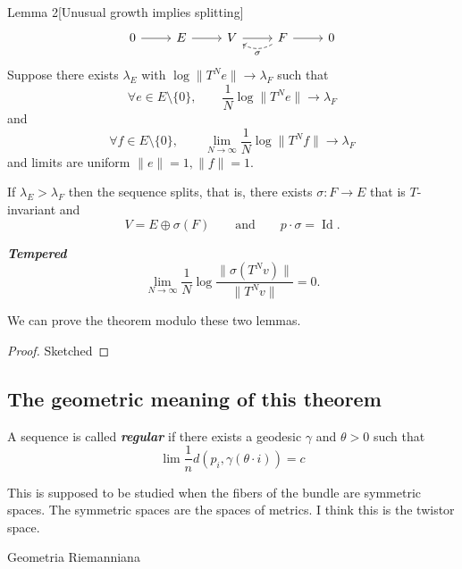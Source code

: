 \begin{thing8}{Lemma 2}[Unusual growth implies splitting]\leavevmode
\[\begin{tikzcd}0\arrow[r]&E\arrow[r]&V\arrow[r]&F\arrow[r]\arrow[l,bend left,dashed,"\sigma"]&0\end{tikzcd}\]
Suppose there exists \(\lambda_E\) with \(\operatorname{log} \|T^N e\|\to \lambda_F\) such that
\[\forall e \in E\setminus\{0\},\qquad \frac{1}{N}\operatorname{log}\|T^Ne\|\to \lambda_F\]
and
\[\forall f \in E\setminus\{0\},\qquad \lim_{N\to \infty} \frac{1}{N}\operatorname{log}\|T^N f\|\to \lambda_F\]
and limits are uniform \(\|e\|=1,\|f\|=1\).

If \(\lambda_E > \lambda_F\) then the sequence splits, that is, there exists \(\sigma:F \to E\) that is  \(T\)-invariant and
\[V=E \oplus \sigma(F)\qquad \text{and} \qquad p\cdot \sigma=\operatorname{Id}.\]
\end{thing8}

\begin{defn}\leavevmode
\textit{\textbf{Tempered}} 
\[\lim_{N\to \infty} \frac{1}{N}\operatorname{log}\frac{\|\sigma(T^N v)\|}{\|T^Nv\|}=0.\]
\end{defn}

We can prove the theorem modulo these two lemmas.

\begin{proof}\leavevmode
Sketched
\end{proof}

\subsection{The geometric meaning of this theorem}

\begin{defn}\leavevmode
A sequence is called \textit{\textbf{regular}} if there exists a geodesic \(\gamma\) and \(\theta>0\) such that
\[\lim \frac{1}{n}d(p_i, \gamma(\theta\cdot i))=c \]
\end{defn}

\begin{remark}\leavevmode
This is supposed to be studied when the fibers of the bundle are symmetric spaces. The symmetric spaces are the spaces of metrics. I think this is the twistor space.
\end{remark}

\clearpage{}
{\Huge Geometria Riemanniana}

